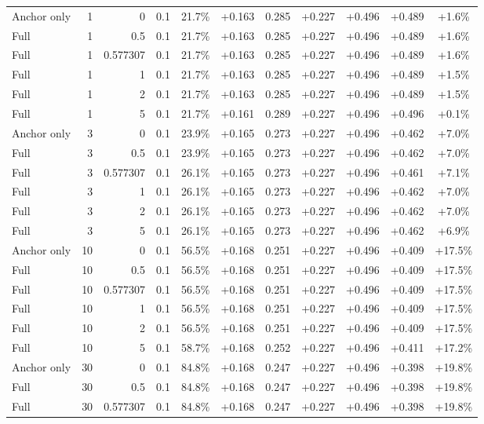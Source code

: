 \begin{table}[htbp]
\begin{tabular}{lrrrccccccc}
Anchor only & 1 & 0 & 0.1 & 21.7\% & +0.163 & 0.285 & +0.227 & +0.496 & +0.489 & +1.6\% \\
Full & 1 & 0.5 & 0.1 & 21.7\% & +0.163 & 0.285 & +0.227 & +0.496 & +0.489 & +1.6\% \\
Full & 1 & 0.577307 & 0.1 & 21.7\% & +0.163 & 0.285 & +0.227 & +0.496 & +0.489 & +1.6\% \\
Full & 1 & 1 & 0.1 & 21.7\% & +0.163 & 0.285 & +0.227 & +0.496 & +0.489 & +1.5\% \\
Full & 1 & 2 & 0.1 & 21.7\% & +0.163 & 0.285 & +0.227 & +0.496 & +0.489 & +1.5\% \\
Full & 1 & 5 & 0.1 & 21.7\% & +0.161 & 0.289 & +0.227 & +0.496 & +0.496 & +0.1\% \\
Anchor only & 3 & 0 & 0.1 & 23.9\% & +0.165 & 0.273 & +0.227 & +0.496 & +0.462 & +7.0\% \\
Full & 3 & 0.5 & 0.1 & 23.9\% & +0.165 & 0.273 & +0.227 & +0.496 & +0.462 & +7.0\% \\
Full & 3 & 0.577307 & 0.1 & 26.1\% & +0.165 & 0.273 & +0.227 & +0.496 & +0.461 & +7.1\% \\
Full & 3 & 1 & 0.1 & 26.1\% & +0.165 & 0.273 & +0.227 & +0.496 & +0.462 & +7.0\% \\
Full & 3 & 2 & 0.1 & 26.1\% & +0.165 & 0.273 & +0.227 & +0.496 & +0.462 & +7.0\% \\
Full & 3 & 5 & 0.1 & 26.1\% & +0.165 & 0.273 & +0.227 & +0.496 & +0.462 & +6.9\% \\
Anchor only & 10 & 0 & 0.1 & 56.5\% & +0.168 & 0.251 & +0.227 & +0.496 & +0.409 & +17.5\% \\
Full & 10 & 0.5 & 0.1 & 56.5\% & +0.168 & 0.251 & +0.227 & +0.496 & +0.409 & +17.5\% \\
Full & 10 & 0.577307 & 0.1 & 56.5\% & +0.168 & 0.251 & +0.227 & +0.496 & +0.409 & +17.5\% \\
Full & 10 & 1 & 0.1 & 56.5\% & +0.168 & 0.251 & +0.227 & +0.496 & +0.409 & +17.5\% \\
Full & 10 & 2 & 0.1 & 56.5\% & +0.168 & 0.251 & +0.227 & +0.496 & +0.409 & +17.5\% \\
Full & 10 & 5 & 0.1 & 58.7\% & +0.168 & 0.252 & +0.227 & +0.496 & +0.411 & +17.2\% \\
Anchor only & 30 & 0 & 0.1 & 84.8\% & +0.168 & 0.247 & +0.227 & +0.496 & +0.398 & +19.8\% \\
Full & 30 & 0.5 & 0.1 & 84.8\% & +0.168 & 0.247 & +0.227 & +0.496 & +0.398 & +19.8\% \\
Full & 30 & 0.577307 & 0.1 & 84.8\% & +0.168 & 0.247 & +0.227 & +0.496 & +0.398 & +19.8\% \\

\end{tabular}
\end{table}

